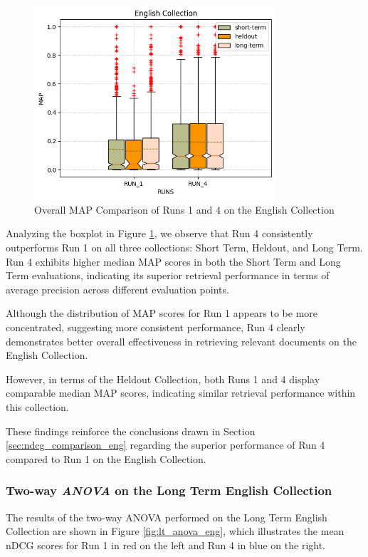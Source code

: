 \begin{figure}[!h]
\centering
\includegraphics[width=0.8\textwidth]{figure/StatisticalAnalysis/BoxPlot/MAP English.png}
\caption{Overall \ac{MAP} Comparison of Runs 1 and 4 on the English Collection}
\label{fig:map_english}
\end{figure}

\newpage
Analyzing the boxplot in Figure \ref{fig:map_english}, we observe that Run 4 consistently outperforms Run 1 on all three collections: Short Term, Heldout, and Long Term. 
Run 4 exhibits higher median \ac{MAP} scores in both the Short Term and Long Term evaluations, indicating its superior retrieval performance in terms of average precision across different evaluation points.

Although the distribution of \ac{MAP} scores for Run 1 appears to be more concentrated, suggesting more consistent performance, Run 4 clearly demonstrates better overall effectiveness in retrieving relevant documents on the English Collection.

However, in terms of the Heldout Collection, both Runs 1 and 4 display comparable median \ac{MAP} scores, indicating similar retrieval performance within this collection. 

These findings reinforce the conclusions drawn in Section \ref{sec:ndcg_comparison_eng} regarding the superior performance of Run 4 compared to Run 1 on the English Collection. 


\subsubsection{Two-way \textit{ANOVA} on the Long Term English Collection}

The results of the two-way \ac{ANOVA} performed on the Long Term English Collection are shown in Figure \ref{fig:lt_anova_eng}, which illustrates the mean \ac{nDCG} scores for Run 1 in red on the left and Run 4 in blue on the right. 

